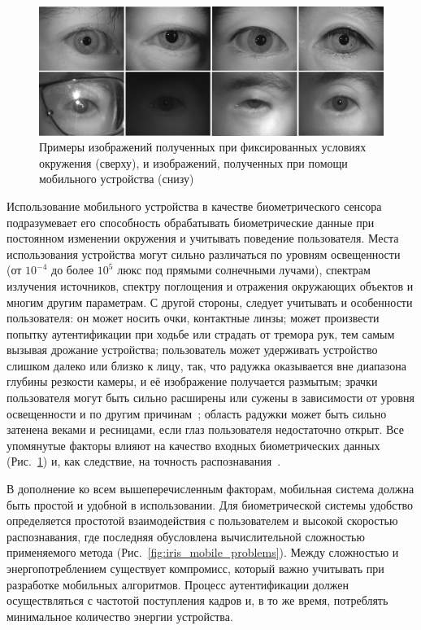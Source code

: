 \begin{figure}[t!]
	\centering
	\includegraphics[width=0.95\columnwidth]{pictures/mobile-examples.png}
	\caption{Примеры изображений полученных при фиксированных условиях окружения (сверху), и изображений, полученных при помощи мобильного устройства (снизу)}
	\label{fig:casia-mobile-examples}
\end{figure}

Использование мобильного устройства в качестве биометрического сенсора подразумевает его способность обрабатывать биометрические данные при постоянном изменении окружения и учитывать поведение пользователя. Места использования устройства могут сильно различаться по уровням освещенности (от $10^{-4}$ до более $10^5$ люкс под прямыми солнечными лучами), спектрам излучения источников, спектру поглощения и отражения окружающих объектов и многим другим параметрам. С другой стороны, следует учитывать и особенности пользователя: он может носить очки, контактные линзы; может произвести попытку аутентификации при ходьбе или страдать от тремора рук, тем самым вызывая дрожание устройства; пользователь может удерживать устройство слишком далеко или близко к лицу, так, что радужка оказывается вне диапазона глубины резкости камеры, и её изображение получается размытым; зрачки пользователя могут быть сильно расширены или сужены в зависимости от уровня освещенности и по другим причинам~\cite{matveev_doctor_thesis,thavalengal_2016,odinokikh_hprec_2018}; область радужки может быть сильно затенена веками и ресницами, если глаз пользователя недостаточно открыт. Все упомянутые факторы влияют на качество входных биометрических данных (Рис.~\ref{fig:casia-mobile-examples}) и, как следствие, на точность распознавания~\cite{tabassi_2011}.

В дополнение ко всем вышеперечисленным факторам, мобильная система должна быть простой и удобной в использовании. Для биометрической системы удобство определяется простотой взаимодействия с пользователем и высокой скоростью распознавания, где последняя обусловлена вычислительной сложностью применяемого метода (Рис.~\ref{fig:iris_mobile_problems}). Между сложностью и энергопотреблением существует компромисс, который важно учитывать при разработке мобильных алгоритмов. Процесс аутентификации должен осуществляться с частотой поступления кадров и, в то же время, потреблять минимальное количество энергии устройства.

